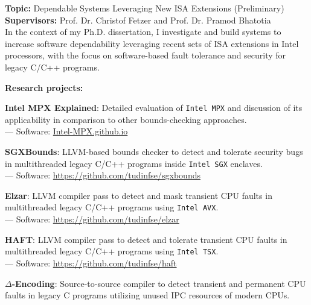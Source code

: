 \documentclass[letterpaper]{article}
\renewenvironment{itemize}{
  \begin{list}{}{
    \setlength{\leftmargin}{1.5em}
  }
}{
  \end{list}
}
\begin{document}
\begin{itemize}
\item {\bf Topic:} Dependable Systems Leveraging New ISA Extensions (Preliminary)\\
{\bf Supervisors:} Prof. Dr. Christof Fetzer and Prof. Dr. Pramod Bhatotia\vspace{-13pt}\\

In the context of my Ph.D. dissertation, I investigate and build systems to increase software dependability leveraging recent sets of ISA extensions in Intel processors, with the focus on software-based fault tolerance and security for legacy C/C++ programs. %

{\bf Research projects:}
	\begin{itemize}%
	
		\item  {\bf Intel MPX Explained}: Detailed evaluation of {\tt Intel MPX} and discussion of its applicability in comparison to other bounds-checking approaches.\\
			--- Software: \href{https://intel-mpx.github.io/}{Intel-MPX.github.io}
		
		\item {\bf SGXBounds}: LLVM-based bounds checker to detect and tolerate security bugs in multithreaded legacy C/C++ programs inside {\tt Intel SGX} enclaves.\\
			--- Software: \href{https://github.com/tudinfse/sgxbounds}{https://github.com/tudinfse/sgxbounds}
			
			
		\item {\bf Elzar}: LLVM compiler pass to detect and mask transient CPU faults in multithreaded legacy C/C++ programs using {\tt Intel AVX}.\\
		 --- Software: \href{https://github.com/tudinfse/elzar}{https://github.com/tudinfse/elzar}
		 
		\item {\bf HAFT}: LLVM compiler pass to detect and tolerate transient CPU faults in multithreaded legacy C/C++ programs using {\tt Intel TSX}.\\
				--- Software: \href{https://github.com/tudinfse/haft}{https://github.com/tudinfse/haft}
				
		\item {\bf $\Delta$-Encoding}: Source-to-source compiler to detect transient and permanent CPU faults in legacy C programs utilizing unused IPC resources of modern CPUs.
	\end{itemize}%
\end{itemize}%
\end{document}
